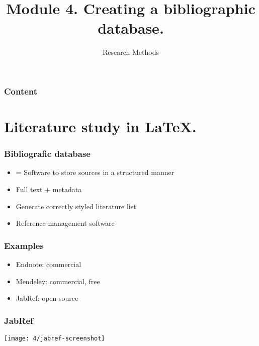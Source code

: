 \documentclass[aspectratio=169]{beamer}
\title{Module 4. Creating a bibliographic database.}
\subtitle{Research Methods}
\author{\lecturers}   %
\date{\academicyear}
\begin{document}
\begin{frame}
  \maketitle
\end{frame}

\begin{frame}
  \frametitle{Content}

  \tableofcontents
\end{frame}

\section{Literature study in {\LaTeX}.}

\begin{frame}
    \frametitle{Bibliografic database}
    
    \begin{itemize}
        \item = Software to store sources in a structured manner
        \item Full text + metadata
        \item Generate correctly styled literature list
        \item Reference management software
    \end{itemize}    
\end{frame}

\begin{frame}
    \frametitle{Examples}
    
    \begin{itemize}
        \item Endnote: commercial
        \item Mendeley: commercial, free
        \item JabRef: open source
    \end{itemize}
    
\end{frame}

\begin{frame}[plain]
    \frametitle{JabRef}
    
    \centering
    \texttt{[image: 4/jabref-screenshot]}
    
\end{frame}
\end{document}
